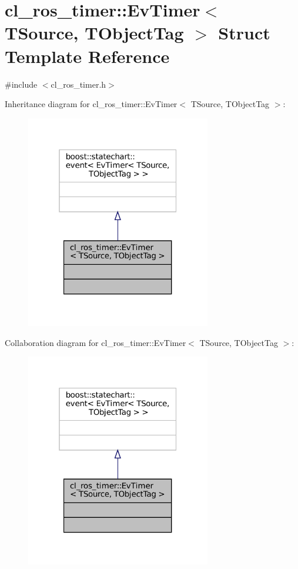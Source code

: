 \hypertarget{structcl__ros__timer_1_1EvTimer}{}\section{cl\+\_\+ros\+\_\+timer\+:\+:Ev\+Timer$<$ T\+Source, T\+Object\+Tag $>$ Struct Template Reference}
\label{structcl__ros__timer_1_1EvTimer}


{\ttfamily \#include $<$cl\+\_\+ros\+\_\+timer.\+h$>$}



Inheritance diagram for cl\+\_\+ros\+\_\+timer\+:\+:Ev\+Timer$<$ T\+Source, T\+Object\+Tag $>$\+:
\nopagebreak
\begin{figure}[H]
\begin{center}
\leavevmode
\includegraphics[width=229pt]{structcl__ros__timer_1_1EvTimer__inherit__graph}
\end{center}
\end{figure}


Collaboration diagram for cl\+\_\+ros\+\_\+timer\+:\+:Ev\+Timer$<$ T\+Source, T\+Object\+Tag $>$\+:
\nopagebreak
\begin{figure}[H]
\begin{center}
\leavevmode
\includegraphics[width=229pt]{structcl__ros__timer_1_1EvTimer__coll__graph}
\end{center}
\end{figure}


